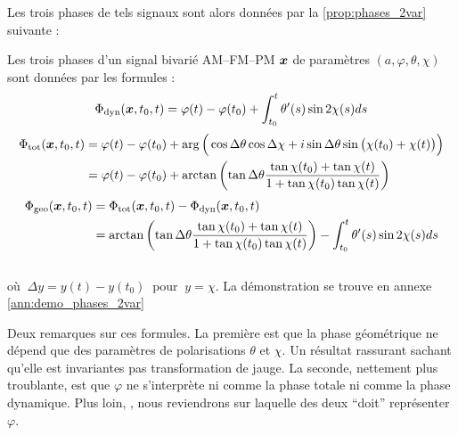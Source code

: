 Les trois phases de tels signaux sont alors données par la \cref{prop:phases_2var} suivante :
\begin{proposition}\label{prop:phases_2var}
	Les trois phases d'un signal bivarié AM--FM--PM $\bf{x}$ de paramètres $(a,\varphi,\theta,\chi)$ sont données par les formules :
	\begin{equation}\label{eq:phased_2var}
		\phased(\bf{x}, t_0,t) = \varphi(t) -\varphi(t_0) + \int_{t_0}^t\theta'(s) \sin2\chi(s) ds
	\end{equation}
	\begin{equation}\label{eq:phaset_2var}
	\begin{aligned}
		\phaset(\bf{x},t_0,t) &= \varphi(t)-\varphi(t_0) + \arg\Big(\cos\Delta\theta \cos\Delta\chi + i\sin\Delta\theta \sin\big(\chi(t_0)+\chi(t)\big)\Big) \\
		&= \varphi(t)-\varphi(t_0) + \arctan\left(\tan\Delta\theta \frac{ \tan\chi(t_0)+\tan\chi(t)}{1 + \tan\chi(t_0)\tan\chi(t)}\right)
	\end{aligned}
	\end{equation}
	\begin{equation}\label{eq:phaseg_2var}
	\begin{aligned}
		\phaseg(\bf{x},t_0,t) &= \phaset(\bf{x},t_0,t) - \phased(\bf{x},t_0,t) \\
			&= \arctan\left(\tan\Delta\theta \frac{ \tan\chi(t_0)+\tan\chi(t)}{1 + \tan\chi(t_0)\tan\chi(t)}\right) - \int_{t_0}^t\theta'(s) \sin2\chi(s) ds
	\end{aligned}
	\end{equation}
	\\
	où $\ \Delta y = y(t) - y(t_0)\ $ pour $\ y = \chi$. La démonstration se trouve en annexe \ref{ann:demo_phases_2var} 
\end{proposition}
\skipl

Deux remarques sur ces formules. 
La première est que la phase géométrique ne dépend que des paramètres de polarisations $\theta$ et $\chi$. 
Un résultat rassurant sachant qu'elle est invariantes pas transformation de jauge.
La seconde, nettement plus troublante, est que $\varphi$ ne s'interprète ni comme la phase totale ni comme la phase dynamique. Plus loin, , nous reviendrons sur laquelle des deux ``doit'' représenter $\varphi$.
\\

